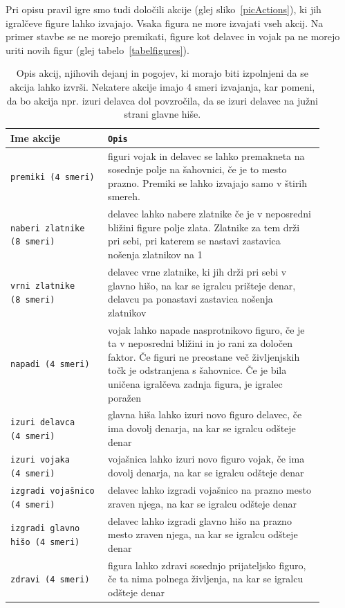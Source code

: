 \documentclass[a4paper, 12pt]{book}
\begin{document}
Pri opisu pravil igre smo tudi določili akcije (glej sliko~\ref{picActions}), ki jih igralčeve figure lahko izvajajo. 
Vsaka figura ne more izvajati vseh akcij. 
Na primer stavbe se ne morejo premikati, figure kot delavec in vojak pa ne morejo uriti novih figur (glej tabelo~\ref{tabelfigures}).

\begin{table}
	\begin{center}
		\begin{tabular}{p{0.28\linewidth}|p{0.62\linewidth}}
			Ime akcije                          & {\tt Opis} \\ \hline
			{\tt premiki (4~smeri)}             & figuri vojak in delavec se lahko premakneta na sosednje polje na šahovnici, če je to mesto prazno.
												Premiki se lahko izvajajo samo v štirih smereh. \\
			{\tt naberi zlatnike (8~smeri)}     & delavec lahko nabere zlatnike če je v neposredni bližini figure polje zlata.
												Zlatnike za tem drži pri sebi, pri katerem se nastavi zastavica nošenja zlatnikov na 1\\
			{\tt vrni zlatnike (8~smeri)}       & delavec vrne zlatnike, ki jih drži pri sebi v glavno hišo, na kar se igralcu prišteje denar, delavcu pa ponastavi zastavica nošenja zlatnikov\\
			{\tt napadi (4~smeri)}              & vojak lahko napade nasprotnikovo figuro, če je ta v neposredni bližini in jo rani za določen faktor. 
												Če figuri ne preostane več življenjskih točk je odstranjena s šahovnice. Če je bila uničena igralčeva zadnja figura, je igralec poražen \\
			{\tt izuri delavca (4~smeri)}       & glavna hiša lahko izuri novo figuro delavec, če ima dovolj denarja, na kar se igralcu odšteje denar\\
			{\tt izuri vojaka (4~smeri)}        & vojašnica lahko izuri novo figuro vojak, če ima dovolj denarja, na kar se igralcu odšteje denar \\
			{\tt izgradi vojašnico (4~smeri)}   & delavec lahko izgradi vojašnico na prazno mesto zraven njega, na kar se igralcu odšteje denar \\
			{\tt izgradi glavno hišo (4~smeri)} & delavec lahko izgradi glavno hišo na prazno mesto zraven njega, na kar se igralcu odšteje denar \\
			{\tt zdravi (4~smeri)}              & figura lahko zdravi sosednjo prijateljsko figuro, če ta nima polnega življenja, na kar se igralcu odšteje denar\\
		\end{tabular}
	\end{center}
	\caption{Opis akcij, njihovih dejanj in pogojev, ki morajo biti izpolnjeni da se akcija lahko izvrši. Nekatere akcije imajo 4 smeri izvajanja, kar pomeni, da bo akcija npr. izuri delavca dol povzročila, da se izuri delavec na južni strani glavne hiše.}
	\label{tableActions}
\end{table}
\end{document}
